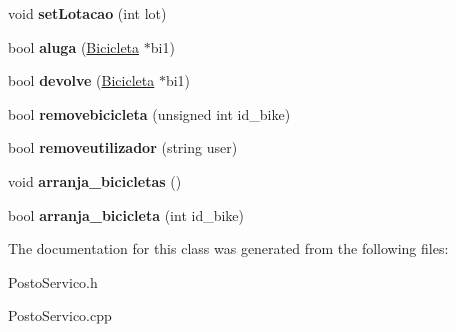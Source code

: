 \begin{DoxyCompactItemize}
\item 
\hypertarget{class_posto_servico_a0acde19dbfc74b355e1aa2e34f25fa11}{void {\bfseries set\+Lotacao} (int lot)}\label{class_posto_servico_a0acde19dbfc74b355e1aa2e34f25fa11}

\item 
\hypertarget{class_posto_servico_a30d51d2560c0239ecb513db121a604a7}{bool {\bfseries aluga} (\hyperlink{class_bicicleta}{Bicicleta} $\ast$bi1)}\label{class_posto_servico_a30d51d2560c0239ecb513db121a604a7}

\item 
\hypertarget{class_posto_servico_a9b7c97136f4b1e2cc7d90cbdb54c3f53}{bool {\bfseries devolve} (\hyperlink{class_bicicleta}{Bicicleta} $\ast$bi1)}\label{class_posto_servico_a9b7c97136f4b1e2cc7d90cbdb54c3f53}

\item 
\hypertarget{class_posto_servico_a01c59324f65bf70ce5400718cde0791a}{bool {\bfseries removebicicleta} (unsigned int id\+\_\+bike)}\label{class_posto_servico_a01c59324f65bf70ce5400718cde0791a}

\item 
\hypertarget{class_posto_servico_a9cab807cf7fcecad5e8231abdb7ef491}{bool {\bfseries removeutilizador} (string user)}\label{class_posto_servico_a9cab807cf7fcecad5e8231abdb7ef491}

\item 
\hypertarget{class_posto_servico_a15a1ac03805060f0b2282e32c8f95da2}{void {\bfseries arranja\+\_\+bicicletas} ()}\label{class_posto_servico_a15a1ac03805060f0b2282e32c8f95da2}

\item 
\hypertarget{class_posto_servico_a116efc301c6955001083ba199ed96ed2}{bool {\bfseries arranja\+\_\+bicicleta} (int id\+\_\+bike)}\label{class_posto_servico_a116efc301c6955001083ba199ed96ed2}

\end{DoxyCompactItemize}


The documentation for this class was generated from the following files\+:\begin{DoxyCompactItemize}
\item 
Posto\+Servico.\+h\item 
Posto\+Servico.\+cpp\end{DoxyCompactItemize}

